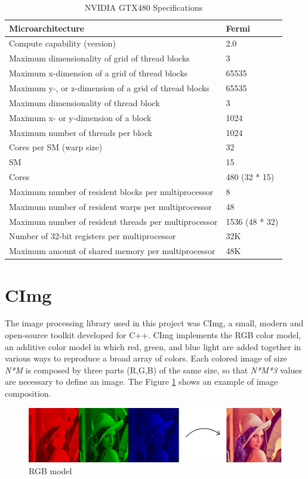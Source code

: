 \documentclass[a4paper]{article}
\begin{document}
\begin{table}[ht]
\centering
\begin{tabular}{l|l}
Microarchitecture & Fermi \\ \hline
Compute capability (version) & 2.0 \\ \hline
Maximum dimensionality of grid of thread blocks & 3 \\ \hline
Maximum x-dimension of a grid of thread blocks & 65535 \\ \hline
Maximum y-, or z-dimension of a grid of thread blocks & 65535 \\ \hline
Maximum dimensionality of thread block & 3 \\ \hline
Maximum x- or y-dimension of a block & 1024 \\ \hline
Maximum number of threads per block & 1024 \\ \hline
Cores per SM (warp size) & 32 \\ \hline
SM & 15 \\ \hline
Cores & 480 (32 * 15) \\ \hline
Maximum number of resident blocks per multiprocessor & 8 \\ \hline
Maximum number of resident warps per multiprocessor & 48 \\ \hline
Maximum number of resident threads per multiprocessor & 1536 (48 * 32) \\ \hline
Number of 32-bit registers per multiprocessor & 32K \\ \hline
Maximum amount of shared memory per multiprocessor & 48K
\end{tabular}
\caption{NVIDIA GTX480 Specifications}
\label{table:t1}
\end{table}


\section{CImg}
\label{sec:cimg}
The image processing library used in this project was CImg, a small, modern and open-source toolkit developed for C++. CImg implements the RGB color model, an additive color model in which red, green, and blue light are added together in various ways to reproduce a broad array of colors. Each colored image of size \textit{N*M} is composed by three parts (R,G,B) of the same size, so that \textit{N*M*3} values are necessary to define an image. The Figure \ref{fig:rgb} shows an example of image composition.

\begin{figure}[ht]
    \centering
    \includegraphics[width=0.7\linewidth]{rgb}
    \caption{RGB model}
    \label{fig:rgb}
\end{figure}
\FloatBarrier
\end{document}
